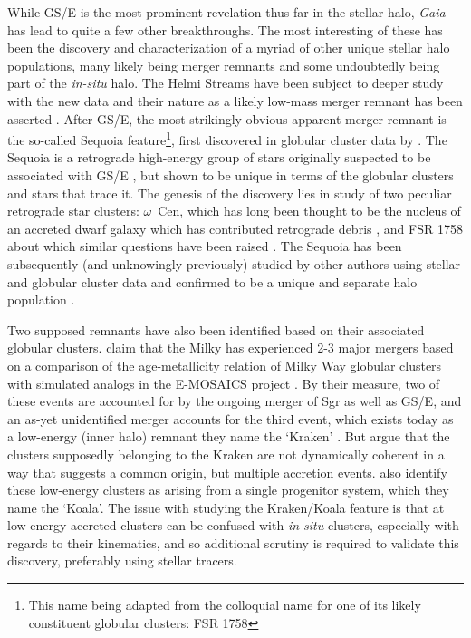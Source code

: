 While GS/E is the most prominent revelation thus far in the stellar halo, \textit{Gaia} has lead to quite a few other breakthroughs. The most interesting of these has been the discovery and characterization of a myriad of other unique stellar halo populations, many likely being merger remnants and some undoubtedly being part of the \textit{in-situ} halo. The Helmi Streams \parencite{helmi99} have been subject to deeper study with the new data and their nature as a likely low-mass merger remnant has been asserted \parencite{koppelman19a}. After GS/E, the most strikingly obvious apparent merger remnant is the so-called Sequoia feature\footnote{This name being adapted from the colloquial name for one of its likely constituent globular clusters: FSR 1758}, first discovered in globular cluster data by \textcite{myeong19}. The Sequoia is a retrograde high-energy group of stars originally suspected to be associated with GS/E \parencite{helmi18}, but shown to be unique in terms of the globular clusters and stars that trace it. The genesis of the discovery lies in  study of two peculiar retrograde star clusters: $\omega$~Cen, which has long been thought to be the nucleus of an accreted dwarf galaxy which has contributed retrograde debris \parencite{bekki03,majewski12}, and FSR 1758 about which similar questions have been raised \parencite{froebrich07,barba19}. The Sequoia has been subsequently (and unknowingly previously) studied by other authors using stellar and globular cluster data and confirmed to be a unique and separate halo population \parencite{koppelman19b,matsuno19,kruijssen20,monty20,naidu20}.

Two supposed remnants have also been identified based on their associated globular clusters. \textcite{kruijssen19b} claim that the Milky has experienced 2-3 major mergers based on a comparison of the age-metallicity relation of Milky Way globular clusters with simulated analogs in the E-MOSAICS project \parencite{kruijssen19a}. By their measure, two of these events are accounted for by the ongoing merger of Sgr as well as GS/E, and an as-yet unidentified merger accounts for the third event, which exists today as a low-energy (inner halo) remnant they name the `Kraken' \parencite{kruijssen20}. But \textcite{massari19} argue that the clusters supposedly belonging to the Kraken are not dynamically coherent in a way that suggests a common origin, but multiple accretion events. \textcite{forbes20} also identify these low-energy clusters as arising from a single progenitor system, which they name the `Koala'. The issue with studying the Kraken/Koala feature is that at low energy accreted clusters can be confused with \textit{in-situ} clusters, especially with regards to their kinematics, and so additional scrutiny is required to validate this discovery, preferably using stellar tracers.

